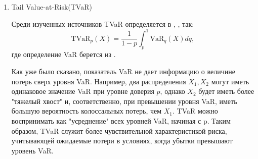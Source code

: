 \documentclass[12pt]{article}
\theoremstyle{plain}
\theoremstyle{definition}
\theoremstyle{remark}
\begin{document}
\begin{enumerate}
\begin{figure}[htp]
    \caption{VaR в случае участков постоянства и разрывов} %
    \label{fig:case1_two_VaR} %

\end{figure}
    Обычно значение $p$ выбирается близким к 1, например, $p = 0.99$. Показатель VaR следует понимать как пороговое значение убытков, превышение которого происходит лишь в $100(1-p)\%$ случаях. Если 
    VaR$_p(X)$ соответствует уровню доверия $p$, то с вероятностью не менее чем $p$, потери не превысят величину VaR$_p(X)$.
    Следует отметить, что показатель VaR не отражает информацию о размере потерь в случае, если они превышают VaR$_p(X)$.

    
    В \cite{Albrecht} определение дается так: 
    \[
        \text{VaR}_p(X) = F^{-1}_X(1-p)= \inf\{x\in\mathbb{R}: F_X(x) \geq 1- p\}
    \]
    Оно практически совпадает с предыдущим, однако здесь уровень доверия $p$ выбирается близким к 0 и понимается как вероятность потерь выше уровня VaR$_p(X)$.

    \item Tail Value-at-Risk(TVaR)

    Среди изученных источников TVaR определяется в \cite{Denuit}, \cite{Desmedt}, \cite{Peng} так:
    \[
        \text{TVaR}_p(X)=\frac{1}{1-p}\int_p^1\text{VaR}_q(X)dq,
    \]
    где определение VaR берется из \cite{Denuit}. 

    Как уже было сказано, показатель VaR не дает информацию о величине потерь сверх уровня VaR. Например, два распределения $X_1, X_2$ могут иметь одинаковое значение VaR при уровне доверия $p$, однако $X_2$ будет иметь более "тяжелый хвост" и, соответственно, при превышении уровня VaR, иметь большую вероятность колоссальных потерь, чем $X_1$. TVaR можно воспринимать как "усреднение" всех уровней VaR, начиная с p. Таким образом, TVaR служит более чувствительной характеристикой риска, учитывающей ожидаемые потери в условиях, когда убытки превышают уровень VaR.


\end{enumerate}
\end{document}
